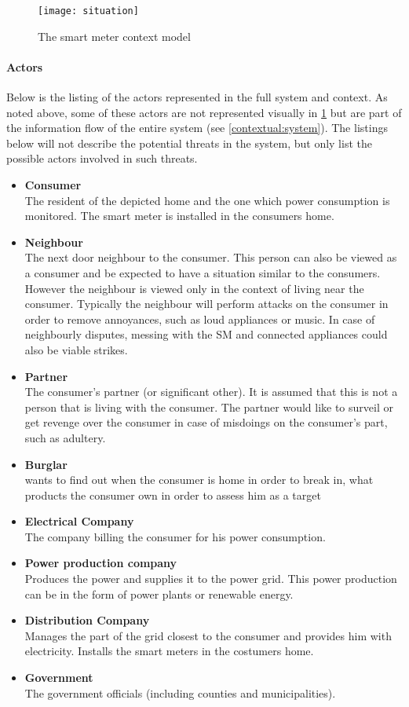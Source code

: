 \begin{figure}
  \centering
  \texttt{[image: situation]}
  \caption{The smart meter context model}
  \label{contextual:sm_model}
\end{figure}

\paragraph{Actors}
Below is the listing of the actors represented in the full system and context.
As noted above, some of these actors are not represented visually in \cref{contextual:sm_model} but are part of the information flow of the entire system (see \cref{contextual:system}).
The listings below will not describe the potential threats in the system, but only list the possible actors involved in such threats.
\begin{itemize}
\item \textbf{Consumer}\\
The resident of the depicted home and the one which power consumption is monitored.
The smart meter is installed in the consumers home.

\item \textbf{Neighbour}\\
The next door neighbour to the consumer.
This person can also be viewed as a consumer and be expected to have a situation similar to the consumers.
However the neighbour is viewed only in the context of living near the consumer.
Typically the neighbour will perform attacks on the consumer in order to remove annoyances, such as loud appliances or music.
In case of neighbourly disputes, messing with the SM and connected appliances could also be viable strikes.
\item \textbf{Partner}\\
The consumer's partner (or significant other).
It is assumed that this is not a person that is living with the consumer.
The partner would like to surveil or get revenge over the consumer in case of misdoings on the consumer's part, such as adultery.
\item \textbf{Burglar}\\ wants to find out when the consumer is home in order to break in, what products the consumer own in order to assess him as a target

\item \textbf{Electrical Company}\\
The company billing the consumer for his power consumption.
\item \textbf{Power production company}\\
Produces the power and supplies it to the power grid.
This power production can be in the form of power plants or renewable energy.
\item \textbf{Distribution Company}\\
Manages the part of the grid closest to the consumer and provides him with electricity.
Installs the smart meters in the costumers home.
\item \textbf{Government}\\
The government officials (including counties and municipalities).


\end{itemize}
